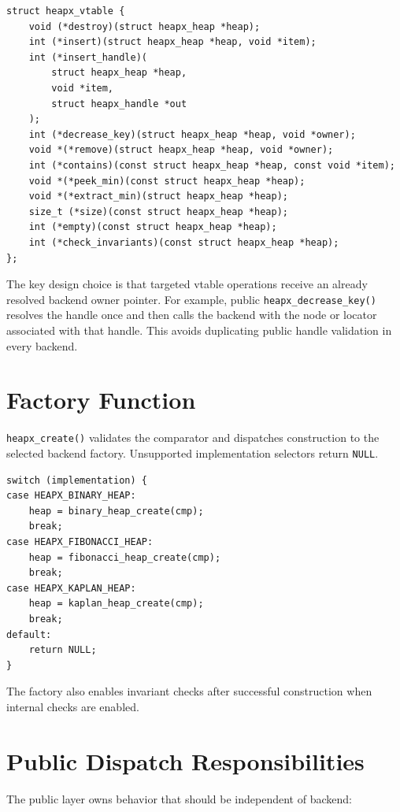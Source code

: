 \begin{lstlisting}[style=cstyle, caption={Simplified vtable shape.}]
struct heapx_vtable {
    void (*destroy)(struct heapx_heap *heap);
    int (*insert)(struct heapx_heap *heap, void *item);
    int (*insert_handle)(
        struct heapx_heap *heap,
        void *item,
        struct heapx_handle *out
    );
    int (*decrease_key)(struct heapx_heap *heap, void *owner);
    void *(*remove)(struct heapx_heap *heap, void *owner);
    int (*contains)(const struct heapx_heap *heap, const void *item);
    void *(*peek_min)(const struct heapx_heap *heap);
    void *(*extract_min)(struct heapx_heap *heap);
    size_t (*size)(const struct heapx_heap *heap);
    int (*empty)(const struct heapx_heap *heap);
    int (*check_invariants)(const struct heapx_heap *heap);
};
\end{lstlisting}

The key design choice is that targeted vtable operations receive an already resolved backend owner pointer.
For example, public \texttt{heapx\_decrease\_key()} resolves the handle once and then calls the backend with the node or locator associated with that handle.
This avoids duplicating public handle validation in every backend.

\section{Factory Function}

\texttt{heapx\_create()} validates the comparator and dispatches construction to the selected backend factory.
Unsupported implementation selectors return \texttt{NULL}.

\begin{lstlisting}[style=cstyle, caption={Factory logic, simplified.}]
switch (implementation) {
case HEAPX_BINARY_HEAP:
    heap = binary_heap_create(cmp);
    break;
case HEAPX_FIBONACCI_HEAP:
    heap = fibonacci_heap_create(cmp);
    break;
case HEAPX_KAPLAN_HEAP:
    heap = kaplan_heap_create(cmp);
    break;
default:
    return NULL;
}
\end{lstlisting}

The factory also enables invariant checks after successful construction when internal checks are enabled.

\section{Public Dispatch Responsibilities}

The public layer owns behavior that should be independent of backend:

